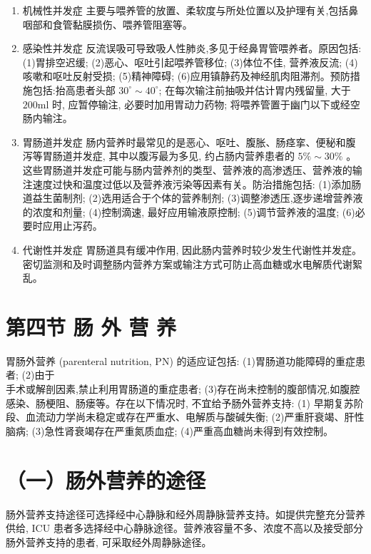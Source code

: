 \documentclass[10pt]{article}
\begin{document}
\begin{enumerate}
  \item 机械性并发症 主要与喂养管的放置、柔软度与所处位置以及护理有关,包括鼻咽部和食管黏膜损伤、喂养管阻塞等。

  \item 感染性并发症 反流误吸可导致吸人性肺炎,多见于经鼻胃管喂养者。原因包括: (1)胃排空迟缓; (2)恶心、呕吐引起喂养管移位; (3)体位不佳, 营养液反流; (4)咳嗽和呕吐反射受损; (5)精神障碍; (6)应用镇静药及神经肌肉阻滞剂。预防措施包括:抬高患者头部 $30^{\circ} \sim 40^{\circ}$; 在每次输注前抽吸并估计胃内残留量, 大于 $200 \mathrm{ml}$ 时, 应暂停输注, 必要时加用胃动力药物; 将喂养管置于幽门以下或经空肠内输注。

  \item 胃肠道并发症 肠内营养时最常见的是恶心、呕吐、腹胀、肠痉挛、便秘和腹泻等胃肠道并发症, 其中以腹泻最为多见, 约占肠内营养患者的 $5 \% \sim 30 \%$ 。这些胃肠道并发症可能与肠内营养剂的类型、营养液的高渗透压、营养液的输注速度过快和温度过低以及营养液污染等因素有关。防治措施包括: (1)添加肠道益生菌制剂; (2)选用适合于个体的营养制剂; (3)调整渗透压,逐步递增营养液的浓度和剂量; (4)控制滴速, 最好应用输液原控制; (5)调节营养液的温度; (6)必要时应用止泻药。

  \item 代谢性并发症 胃肠道具有缓冲作用, 因此肠内营养时较少发生代谢性并发症。密切监测和及时调整肠内营养方案或输注方式可防止高血糖或水电解质代谢絮乱。

\end{enumerate}

\section*{第四节 肠 外 营 养}
胃肠外营养 (parenteral nutrition, PN) 的适应证包括: (1)胃肠道功能障碍的重症患者; (2)由于\\
手术或解剖因素,禁止利用胃肠道的重症患者; (3)存在尚未控制的腹部情况,如腹腔感染、肠梗阻、肠瘘等。存在以下情况时, 不宜给予肠外营养支持: (1) 早期复苏阶段、血流动力学尚未稳定或存在严重水、电解质与酸碱失衡; (2)严重肝衰竭、肝性脑病; (3)急性肾衰竭存在严重氮质血症; (4)严重高血糖尚未得到有效控制。

\section*{（一）肠外营养的途径}
肠外营养支持途径可选择经中心静脉和经外周静脉营养支持。如提供完整充分营养供给, ICU 患者多选择经中心静脉途径。营养液容量不多、浓度不高以及接受部分肠外营养支持的患者, 可采取经外周静脉途径。
\end{document}
